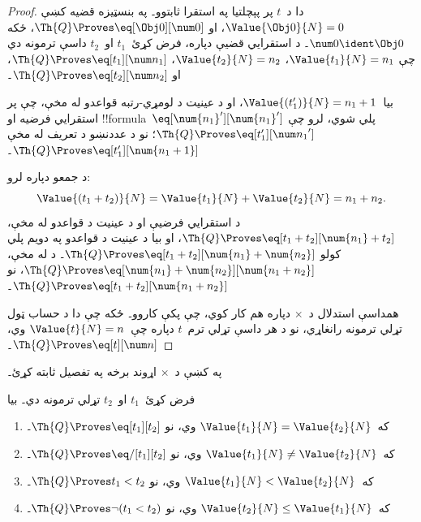 \documentclass[../../../include/open-logic-section]{subfiles}
\begin{document}
\begin{proof}
دا د~$t$ پر پېچلتيا په استقرا ثابتوو۔ په بنسټيزه قضيه کښې
$\Value{\Obj 0}{N} = 0$، او
$\Th{Q} \Proves \eq[\Obj 0][\num 0]$، ځکه
$\num 0 \ident \Obj 0$۔
%
د استقرايي قضيې دپاره، فرض کړئ~$t_1$ او~$t_2$ داسې ترمونه دي چې
$\Value{t_1}{N} = n_1$، $\Value{t_2}{N} = n_2$،
$\Th{Q} \Proves \eq[t_1][\num n_1]$، او
$\Th{Q} \Proves \eq[t_2][\num n_2]$۔

بيا~$\Value{(t_1')}{N} = n_1 + 1$، او د عينيت د لومړي-رتبه قواعدو
له مخې، چې پر استقرايي فرضيه او
!!{formula}~$\eq[\num{n_1}'][\num{n_1}']$ پلي شوي، لرو چې
$\Th{Q} \Proves \eq[t_1'][{\num n_1}']$؛ نو د عددنښو د تعريف له
مخې $\Th{Q} \Proves \eq[t_1'][\num{n_1 + 1}]$۔

د جمعو دپاره لرو:
\[
      \Value{(t_1 + t_2)}{N}
    = \Value{t_1}{N} + \Value{t_2}{N}
    = n_1 + n_2.
\]
د استقرايي فرضيې او د عينيت د قواعدو له مخې،
$\Th{Q} \Proves \eq[t_1 + t_2][\num{n_1} + t_2]$، او بيا د عينيت
د قواعدو په دويم پلي کولو
$\Th{Q} \Proves \eq[t_1 + t_2][\num{n_1} + \num{n_2}]$۔ د
 له مخې،
$\Th{Q} \Proves \eq[\num{n_1} + \num{n_2}][\num{n_1 + n_2}]$،
نو $\Th{Q} \Proves \eq[t_1 + t_2][\num{n_1 + n_2}]$۔

همداسې استدلال د~$\times$ دپاره هم کار کوي، چې
 پکې کاروو۔
%
ځکه چې دا د حساب ټول تړلي ترمونه رانغاړي، نو د هر داسې تړلي
ترم~$t$ دپاره چې~$\Value{t}{N} = n$ وي،
$\Th{Q} \Proves \eq[t][\num n]$۔
\end{proof}

\begin{prob}
په  کښې د~$\times$ اړوند برخه په
تفصيل ثابته کړئ۔
\end{prob}

\begin{lem}
فرض کړئ~$t_1$ او~$t_2$ تړلي ترمونه دي۔ بيا
\begin{enumerate}
\item که~$\Value{t_1}{N} = \Value{t_2}{N}$ وي،
    نو $\Th{Q} \Proves \eq[t_1][t_2]$۔
\item که~$\Value{t_1}{N} \neq \Value{t_2}{N}$ وي،
    نو $\Th{Q} \Proves \eq/[t_1][t_2]$۔
\item که~$\Value{t_1}{N} < \Value{t_2}{N}$ وي،
    نو $\Th{Q} \Proves t_1 < t_2$۔
\item که~$\Value{t_2}{N} \leq \Value{t_1}{N}$ وي،
    نو $\Th{Q} \Proves \lnot(t_1 < t_2)$۔
\end{enumerate}
\end{lem}
\end{document}
